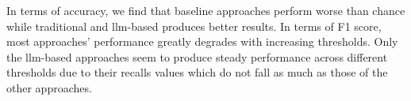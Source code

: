 In terms of accuracy, we find that baseline approaches perform worse than chance while traditional and \ac{llm}-based \imp{} produces better results.
In terms of F1 score, most approaches' performance greatly degrades with increasing thresholds.
Only the \ac{llm}-based approaches seem to produce steady performance across different thresholds due to their recalls values which do not fall as much as those of the other approaches.

%     


%     
